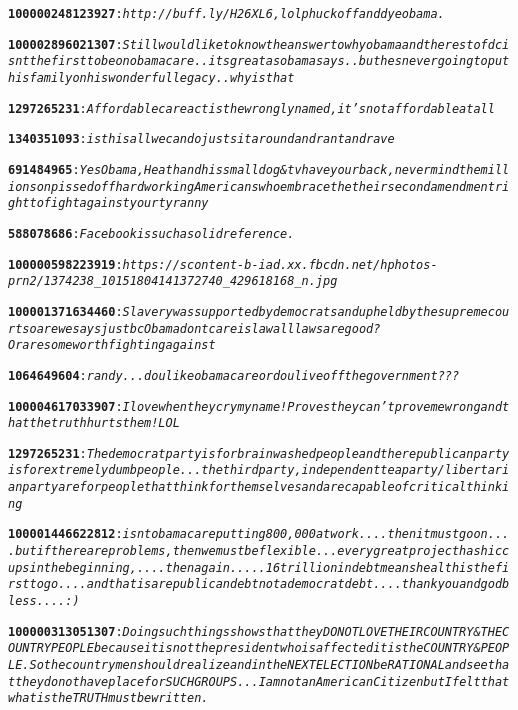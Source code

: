 \begin{alltt}
\textbf{100000248123927}: \emph{http://buff.ly/H26XL6, lol phuck off and dye obama.}

\textbf{100002896021307}: \emph{Still would like to know the answer to why obama and the rest of dc isnt the first to be on obamacare..its great as obama says ..but hes never going to put his family on his wonderful legacy..why is that}

\textbf{1297265231}: \emph{Affordable care act is the wrongly named, it's not affordable at all}

\textbf{1340351093}: \emph{is this all we can do just sit around and rant and rave}

\textbf{691484965}: \emph{Yes Obama, Heath and his small dog & tv have your back, never mind the millions on pissed off hard working Americans who embrace the their second amendment right to fight against your tyranny}

\textbf{588078686}: \emph{Facebook is such a solid reference.}

\textbf{100000598223919}: \emph{https://scontent-b-iad.xx.fbcdn.net/hphotos-prn2/1374238_10151804141372740_429618168_n.jpg}

\textbf{100001371634460}: \emph{Slavery was supported by democrats and upheld by the supreme court so are we says just bc Obamadontcare is law all laws are good? Or are some worth fighting against}

\textbf{1064649604}: \emph{randy... do u like obamacare or do u live off the government???}

\textbf{100004617033907}: \emph{I love when they cry my name!  Proves they can't prove me wrong and that the truth hurts them!  LOL}

\textbf{1297265231}: \emph{The democrat party is for brainwashed people and the republican party is for extremely dumb people... the third party, independent tea party/libertarian party are for people that think for themselves and are capable of critical thinking}

\textbf{100001446622812}: \emph{isnt obamacare putting 800,000 at work....then it must go on....but if there are problems, then we must be flexible...every great project has hiccups in the beginning,....then again.....16 trillion in debt means health is the first to go....and that is a republican debt not a democrat debt....thank you and god bless....:)}

\textbf{100000313051307}: \emph{Doing such things shows that they DO NOT LOVE THEIR COUNTRY & THE COUNTRY PEOPLE because it is not the president who is affected it is the COUNTRY & PEOPLE. So the countrymen should realize and in the NEXT ELECTION be RATIONAL and see that they do not have place for SUCH GROUPS... Iam not an American Citizen but I felt that what is the TRUTH must be written .}


\end{alltt}
